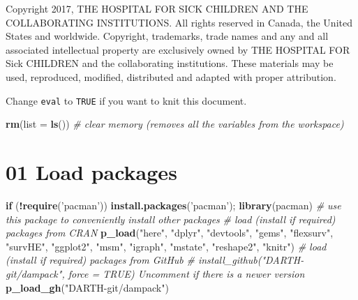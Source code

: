 \documentclass[
]{article}
\newenvironment{Shaded}{\begin{snugshade}}{\end{snugshade}}
\newcommand{\CommentTok}[1]{\textcolor[rgb]{0.56,0.35,0.01}{\textit{#1}}}
\newcommand{\ControlFlowTok}[1]{\textcolor[rgb]{0.13,0.29,0.53}{\textbf{#1}}}
\newcommand{\DataTypeTok}[1]{\textcolor[rgb]{0.13,0.29,0.53}{#1}}
\newcommand{\KeywordTok}[1]{\textcolor[rgb]{0.13,0.29,0.53}{\textbf{#1}}}
\newcommand{\NormalTok}[1]{#1}
\newcommand{\OperatorTok}[1]{\textcolor[rgb]{0.81,0.36,0.00}{\textbf{#1}}}
\newcommand{\StringTok}[1]{\textcolor[rgb]{0.31,0.60,0.02}{#1}}
\begin{document}
Copyright 2017, THE HOSPITAL FOR SICK CHILDREN AND THE COLLABORATING
INSTITUTIONS. All rights reserved in Canada, the United States and
worldwide. Copyright, trademarks, trade names and any and all associated
intellectual property are exclusively owned by THE HOSPITAL FOR Sick
CHILDREN and the collaborating institutions. These materials may be
used, reproduced, modified, distributed and adapted with proper
attribution.

Change \texttt{eval} to \texttt{TRUE} if you want to knit this document.

\begin{Shaded}
\begin{Highlighting}[]
\KeywordTok{rm}\NormalTok{(}\DataTypeTok{list =} \KeywordTok{ls}\NormalTok{())      }\CommentTok{# clear memory (removes all the variables from the workspace)}
\end{Highlighting}
\end{Shaded}

\newpage

\hypertarget{load-packages}{%
\section{01 Load packages}\label{load-packages}}

\begin{Shaded}
\begin{Highlighting}[]
\ControlFlowTok{if}\NormalTok{ (}\OperatorTok{!}\KeywordTok{require}\NormalTok{(}\StringTok{'pacman'}\NormalTok{)) }\KeywordTok{install.packages}\NormalTok{(}\StringTok{'pacman'}\NormalTok{); }\KeywordTok{library}\NormalTok{(pacman) }\CommentTok{# use this package to conveniently install other packages}
\CommentTok{# load (install if required) packages from CRAN}
\KeywordTok{p_load}\NormalTok{(}\StringTok{"here"}\NormalTok{, }\StringTok{"dplyr"}\NormalTok{, }\StringTok{"devtools"}\NormalTok{, }\StringTok{"gems"}\NormalTok{, }\StringTok{"flexsurv"}\NormalTok{, }\StringTok{"survHE"}\NormalTok{, }\StringTok{"ggplot2"}\NormalTok{, }\StringTok{"msm"}\NormalTok{, }\StringTok{"igraph"}\NormalTok{, }\StringTok{"mstate"}\NormalTok{,}
        \StringTok{"reshape2"}\NormalTok{, }\StringTok{"knitr"}\NormalTok{)  }
\CommentTok{# load (install if required) packages from GitHub}
\CommentTok{# install_github("DARTH-git/dampack", force = TRUE) Uncomment if there is a newer version}
\KeywordTok{p_load_gh}\NormalTok{(}\StringTok{"DARTH-git/dampack"}\NormalTok{)}
\end{Highlighting}
\end{Shaded}
\end{document}
